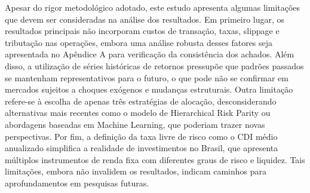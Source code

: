 Apesar do rigor metodológico adotado, este estudo apresenta algumas limitações que devem ser consideradas na análise dos resultados. Em primeiro lugar, os resultados principais não incorporam custos de transação, taxas, slippage e tributação nas operações, embora uma análise robusta desses fatores seja apresentada no Apêndice A para verificação da consistência dos achados. Além disso, a utilização de séries históricas de retornos pressupõe que padrões passados se mantenham representativos para o futuro, o que pode não se confirmar em mercados sujeitos a choques exógenos e mudanças estruturais. Outra limitação refere-se à escolha de apenas três estratégias de alocação, desconsiderando alternativas mais recentes como o modelo de Hierarchical Risk Parity ou abordagens baseadas em Machine Learning, que poderiam trazer novas perspectivas. Por fim, a definição da taxa livre de risco como o CDI médio anualizado simplifica a realidade de investimentos no Brasil, que apresenta múltiplos instrumentos de renda fixa com diferentes graus de risco e liquidez. Tais limitações, embora não invalidem os resultados, indicam caminhos para aprofundamentos em pesquisas futuras.
